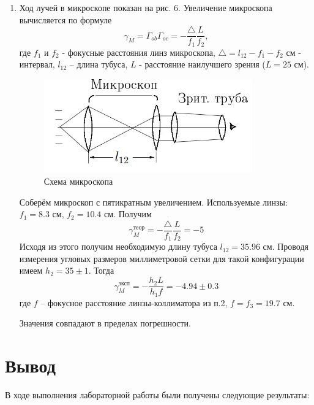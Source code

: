 \documentclass[a4paper,12pt]{article}
\begin{document}
\begin{enumerate}
    \item Ход лучей в микроскопе показан на рис. 6. Увеличение микроскопа вычисляется по формуле
    \begin{equation}
        \gamma_M = \Gamma_{ob} \Gamma_{oc} = -\frac{\triangle}{f_1} \frac{L}{f_2},
    \end{equation}
    где $f_1$ и $f_2$ - фокусные расстояния линз микроскопа, $\triangle = l_{12}-f_1-f_2$ см - интервал, $ l_{12} $ -- длина тубуса, $L$ - расстояние наилучшего зрения ($L = 25$ см).
    
    \begin{figure}[h]
        \centering
        \includegraphics[width=9cm]{micro.jpg}
        \caption{Схема микроскопа}
    \end{figure}    
    
     Соберём микроскоп с пятикратным увеличением. Используемые линзы: $f_1 = 8.3 $ см, $ f_2 = 10.4 $ см. Получим
        \[ \gamma_M^\text{теор} = -\frac{\triangle}{f_1} \frac{L}{f_2} = -5 \]
    Исходя из этого получим необходимую длину тубуса $ l_{12} = 35.96 $ см.
    Проводя измерения угловых размеров миллиметровой сетки для такой конфигурации имеем $ h_2 = 35\pm1 $. Тогда
        \[ \boxed{\gamma_M^\text{эксп} = -\frac{h_2L}{h_1f} = -4.94 \pm 0.3} \]
        где $ f $ -- фокусное расстояние линзы-коллиматора из п.2, $ f = f_3 = 19.7 $ см.

Значения совпадают в пределах погрешности.
\end{enumerate}

\section*{Вывод}
В ходе выполнения лабораторной работы были получены следующие результаты:
\end{document}
